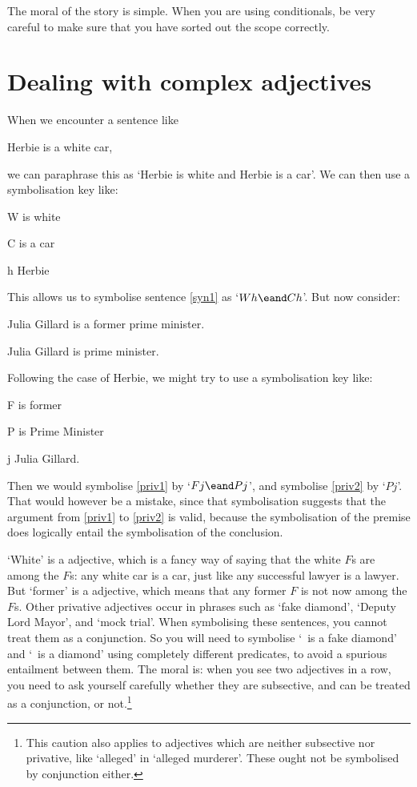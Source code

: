 The moral of the story is simple. When you are using conditionals, be very careful to make sure that you have sorted out the scope correctly. 

\section{Dealing with complex adjectives%
}
When we encounter a sentence like 
	\begin{earg}
		\item[\ex{syn1}] Herbie is a white car,
	\end{earg}
we can paraphrase this as `Herbie is white and Herbie is a car'. We can then use a symbolisation key like:
	\begin{ekey}
		\item[W]  is white
		\item[C]  is a car
		\item[h] Herbie
	\end{ekey}
This allows us to symbolise sentence \ref{syn1} as `$Wh \eand Ch$'. But now consider:
\begin{earg}
	\item[\ex{priv1}] Julia Gillard is a former prime minister.
	\item[\ex{priv2}] Julia Gillard is prime minister.
\end{earg}
Following the case of Herbie, we might try to use a symbolisation key like:
	\begin{ekey}
		\item[F]  is former
		\item[P]  is Prime Minister
		\item[j] Julia Gillard.
	\end{ekey}
Then we would symbolise \ref{priv1} by `$Fj \eand Pj$', and symbolise \ref{priv2} by `$Pj$'. That would however be a mistake, since that symbolisation suggests that the argument from \ref{priv1} to \ref{priv2} is valid, because the symbolisation of the premise does logically entail the symbolisation of the conclusion. 

`White' is a  adjective, which is a fancy way of saying that the white $F$s are among the $F$s: any white car is a car, just like any successful lawyer is a lawyer. But `former' is a  adjective, which means that any former $F$ is not now among the $F$s. Other privative adjectives occur in phrases such as `fake diamond', `Deputy Lord Mayor', and `mock trial'. When symbolising these sentences, you cannot treat them as a conjunction. So you will need to symbolise `\blank\ is a fake diamond' and `\blank\ is a diamond' using completely different predicates, to avoid a spurious entailment between them. The moral is: when you see two adjectives in a row, you need to ask yourself carefully whether they are subsective, and can be treated as a conjunction, or not.\footnote{This caution also applies to adjectives  which are neither subsective nor privative, like `alleged' in `alleged murderer'. These ought not be symbolised by conjunction either.}

